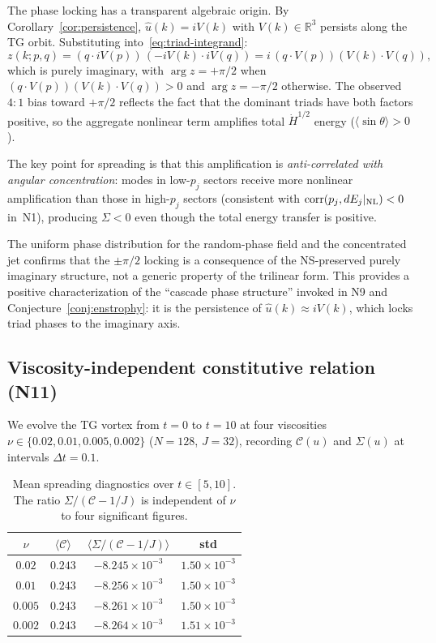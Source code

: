 \documentclass[11pt]{article}
\theoremstyle{definition}
\newcommand{\R}{\mathbb{R}}
\newcommand{\Hdot}[1]{\dot{H}^{#1}}
\newcommand{\cC}{\mathcal{C}}
\DeclareMathOperator{\corr}{corr}
\begin{document}
The phase locking has a transparent algebraic origin.
By Corollary~\ref{cor:persistence}, $\hat u(k)=iV(k)$
with $V(k)\in\R^3$ persists along the TG orbit.
Substituting into~\eqref{eq:triad-integrand}:
\begin{equation}\label{eq:triad-imaginary}
z(k;p,q) = (q\cdot iV(p))\,(-iV(k)\cdot iV(q))
= i\,(q\cdot V(p))(V(k)\cdot V(q)),
\end{equation}
which is purely imaginary, with
$\arg z = +\pi/2$ when $(q\cdot V(p))(V(k)\cdot V(q))>0$
and $\arg z = -\pi/2$ otherwise.  The observed $4\!:\!1$
bias toward $+\pi/2$ reflects the fact that the dominant
triads have both factors positive, so the aggregate
nonlinear term amplifies total $\Hdot{1/2}$ energy
($\langle\sin\theta\rangle>0$).

The key point for spreading is that this amplification
is \emph{anti-correlated with angular concentration}:
modes in low-$p_j$ sectors receive more nonlinear
amplification than those in high-$p_j$ sectors
(consistent with $\corr(p_j,dE_j|_{\rm NL})<0$
in~N1), producing $\Sigma<0$ even though the total
energy transfer is positive.

The uniform phase distribution for the random-phase
field and the concentrated jet confirms that the
$\pm\pi/2$ locking is a consequence of the
NS-preserved purely imaginary structure, not a
generic property of the trilinear form.  This
provides a positive characterization of the
``cascade phase structure'' invoked in N9 and
Conjecture~\ref{conj:enstrophy}: it is the persistence
of $\hat u(k)\approx iV(k)$, which locks triad
phases to the imaginary axis.


\subsection{Viscosity-independent constitutive relation (N11)}
\label{sec:constitutive}

We evolve the TG vortex from $t=0$ to $t=10$ at four
viscosities $\nu\in\{0.02, 0.01, 0.005, 0.002\}$
($N=128$, $J=32$), recording $\cC(u)$ and $\Sigma(u)$
at intervals $\Delta t=0.1$.

\begin{table}[h]
\centering
\caption{Mean spreading diagnostics over
$t\in[5,10]$.  The ratio $\Sigma/(\cC-1/J)$ is
independent of $\nu$ to four significant figures.}
\label{tab:constitutive}
\begin{tabular}{@{}cccc@{}}
\toprule
$\nu$ & $\langle\cC\rangle$
  & $\langle\Sigma/(\cC\!-\!1/J)\rangle$
  & std \\
\midrule
$0.02$  & $0.243$ & $-8.245\times 10^{-3}$ & $1.50\times 10^{-3}$ \\
$0.01$  & $0.243$ & $-8.256\times 10^{-3}$ & $1.50\times 10^{-3}$ \\
$0.005$ & $0.243$ & $-8.261\times 10^{-3}$ & $1.50\times 10^{-3}$ \\
$0.002$ & $0.243$ & $-8.264\times 10^{-3}$ & $1.51\times 10^{-3}$ \\
\bottomrule
\end{tabular}
\end{table}
\end{document}
